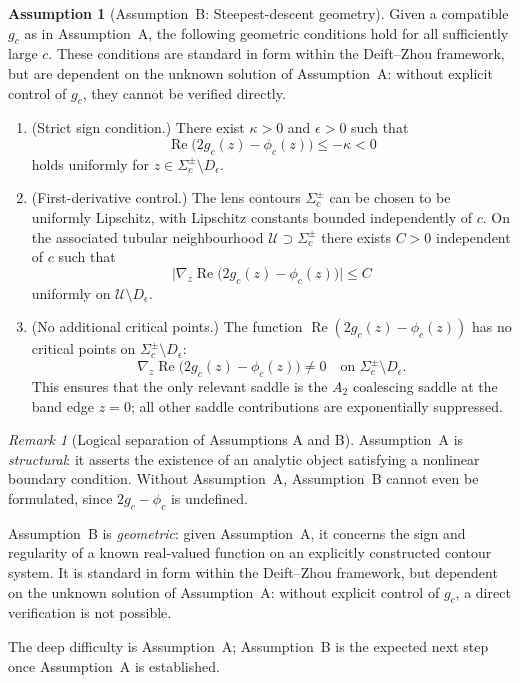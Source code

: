 \documentclass[12pt,a4paper]{amsart}
\theoremstyle{definition}
\newtheorem{assumption}[theorem]{Assumption}
\theoremstyle{remark}
\newtheorem{remark}[theorem]{Remark}
\begin{document}
\begin{assumption}[Assumption~B: Steepest-descent geometry]
\label{ass:g-sign}
Given a compatible $g_c$ as in Assumption~A, the following
geometric conditions hold for all sufficiently large $c$.
These conditions are standard in form within the Deift--Zhou
framework, but are dependent on the unknown solution of Assumption~A:
without explicit control of $g_c$, they cannot be verified directly.

\begin{enumerate}[label=(\roman*)]
\item \textup{(Strict sign condition.)}
There exist $\kappa > 0$ and $\epsilon > 0$ such that
\[
  \operatorname{Re}\!\bigl(2g_c(z) - \phi_c(z)\bigr)
  \le -\kappa < 0
\]
holds uniformly for $z \in \Sigma_c^\pm \setminus D_\epsilon$.

\item \textup{(First-derivative control.)}
The lens contours $\Sigma_c^\pm$ can be chosen to be uniformly
Lipschitz, with Lipschitz constants bounded independently of $c$.
On the associated tubular neighbourhood
$\mathcal{U} \supset \Sigma_c^\pm$ there exists $C > 0$
independent of $c$ such that
\[
  \bigl|\nabla_z \operatorname{Re}\!\bigl(2g_c(z) - \phi_c(z)\bigr)\bigr|
  \le C
\]
uniformly on $\mathcal{U} \setminus D_\epsilon$.

\item \textup{(No additional critical points.)}
The function $\operatorname{Re}(2g_c(z) - \phi_c(z))$ has no
critical points on $\Sigma_c^\pm \setminus D_\epsilon$:
\[
  \nabla_z \operatorname{Re}\!\bigl(2g_c(z) - \phi_c(z)\bigr) \neq 0
  \quad\text{on } \Sigma_c^\pm \setminus D_\epsilon.
\]
This ensures that the only relevant saddle is the $A_2$ coalescing
saddle at the band edge $z=0$; all other saddle contributions are
exponentially suppressed.
\end{enumerate}
\end{assumption}

\begin{remark}[Logical separation of Assumptions A and B]
\label{rem:ab-separation}
Assumption~A is \emph{structural}: it asserts the existence of an
analytic object satisfying a nonlinear boundary condition.
Without Assumption~A, Assumption~B cannot even be formulated,
since $2g_c - \phi_c$ is undefined.

Assumption~B is \emph{geometric}: given Assumption~A, it concerns
the sign and regularity of a known real-valued function on an
explicitly constructed contour system.
It is standard in form within the Deift--Zhou framework, but
dependent on the unknown solution of Assumption~A: without
explicit control of $g_c$, a direct verification is not possible.

The deep difficulty is Assumption~A; Assumption~B is the
expected next step once Assumption~A is established.
\end{remark}
\end{document}
